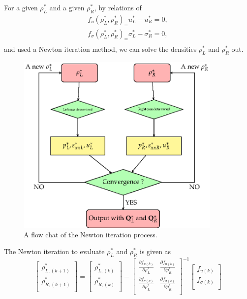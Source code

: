 \documentclass[review]{elsarticle}
\begin{document}
For a given  $\rho_L^*$ and a given $\rho_R^*$,
 by relations of 
\begin{equation}
  \begin{aligned}
	f_u(\rho_L^*,\rho_R^*)_=  u_L^* -u_R^* =0,\\ 
	f_\sigma(\rho_L^*,\rho_R^*)_=  \sigma_L^* -\sigma_R^* =0,\\ 
\end{aligned}
\end{equation}
and used a Newton iteration method, we can solve the densities $\rho_L^*$ and $\rho_R^*$ out.
\begin{figure}
  \centering
  \includegraphics[width= 10cm] {Tikz-figure6.eps}
  \caption{A flow chat of the Newton iteration process.}
  \label{fig:newton}
\end{figure}

The Newton iteration to evaluate $\rho_L^*$ and $\rho_R^*$ is given as
\begin{equation}
\left[ \begin{array}{l}
 \rho _{L,(k+1)}^*\\
\rho_{R,(k+1)}^*\\
\end{array}
\right] = 
\left[ \begin{array}{l}
 \rho _{L,(k)}^*\\
\rho_{R,(k)}^*\\
\end{array}
\right]-
\left[ \begin{array}{ll}
\frac{\partial f_{u(k)}}{\partial \rho_L^*} & \frac{\partial f_{u(k)}}{\partial \rho_R^*}\\
\frac{\partial f_{\sigma(k)}}{\partial \rho_L^*} & \frac{\partial f_{\sigma(k)}}{\partial \rho_R^*}\\
\end{array}
\right]^{-1}
\left[ \begin{array}{l}
f_{u(k)}\\
f_{\sigma(k)}\\
\end{array}
\right]
\end{equation}
\end{document}
